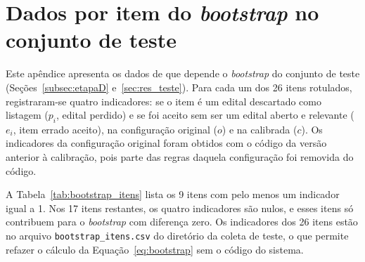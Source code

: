 \chapter{Dados por item do \textit{bootstrap} no conjunto de teste}
\label{ap:bootstrap}

Este apêndice apresenta os dados de que depende o \textit{bootstrap} do
conjunto de teste (Seções~\ref{subsec:etapaD} e~\ref{sec:res_teste}). Para cada
um dos 26 itens rotulados, registraram-se quatro indicadores: se o item é um
edital descartado como listagem ($p_i$, edital perdido) e se foi aceito sem
ser um edital aberto e relevante ($e_i$, item errado aceito), na configuração
original ($o$) e na calibrada ($c$). Os indicadores da configuração original
foram obtidos com o código da versão anterior à calibração, pois parte das
regras daquela configuração foi removida do código.

A Tabela~\ref{tab:bootstrap_itens} lista os 9 itens com pelo menos um
indicador igual a 1. Nos 17 itens restantes, os quatro indicadores são nulos,
e esses itens só contribuem para o \textit{bootstrap} com diferença zero. Os
indicadores dos 26 itens estão no arquivo \texttt{bootstrap\_itens.csv} do
diretório da coleta de teste, o que permite refazer o cálculo da
Equação~\ref{eq:bootstrap} sem o código do sistema.


